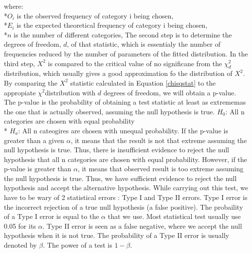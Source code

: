 \documentclass[oneside,12pt]{report}
\begin{document}
where:
\newline
\\*$O_{i}$ is the observed frequency of category i being chosen,
\\*$E_{i}$ is the expected theoretical frequency of category i being chosen,
\\*$n$ is the number of different categories,
\vspace{12pt}
\newline
The second step is to determine the degrees of freedom, $d$, of that statistic, which is essentialy the number of frequencies reduced by the number of parameters of the fitted distribution. In the third step, $X^2$ is compared to the critical value of no significane from the $\chi_{d}^{2}$ distribution, which usually gives a good approximation fo the distribution of $X^2$.
\vspace{12pt}
\newline
By comparing the $X^2$ statistic calculated in Equation \eqref{chisqstat} to the appropiate $\chi^{2}$distribution with $d$ degrees of freedom, we will obtain a p-value. The p-value is the probability of obtaining a test statistic at least as extrememas the one that is actually observed, assuming the null hypothesis is true.
\vspace{6pt}
\newline
$H_0$: All n categories are chosen with equal probability
\\*  $H_a$: All n cateogires are chosen with unequal probability.
\vspace{12pt}
\newline
If the p-value is greater than a given $\alpha$, it means that the result is not that extreme assuming the null hypothesis is true. Thus, there is insufficient evidence to reject the null hypothesis that all n categories are chosen with equal probability. However, if the p-value is greater than $\alpha$, it means that observed result is too extreme assuming the null hypothesis is true. Thus, we have sufficient evidence to reject the null hypothesis and accept the alternative hypothesis.
\vspace{12pt}
\newline
While carrying out this test, we have to be wary of 2 statistical errors : Type I and Type II errors. Type I error is the incorrect rejection of a true null hypothesis (a false positive). The probaility of a Type I error is equal to the $\alpha$ that we use. Most statistical test usually use 0.05 for its $\alpha$. Type II error is seen as a false negative, where we accept the null hypothesis when it is not true. The probability of a Type II error is usually denoted by $\beta$. The power of a test is $1-\beta$.
\end{document}
